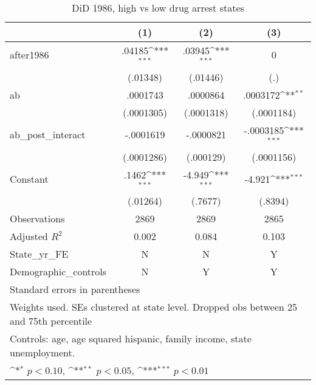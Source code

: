 \begin{table}[htbp]\centering
\def\sym#1{\ifmmode^{#1}\else\(^{#1}\)\fi}
\caption{DiD 1986, high vs low drug arrest states}
\begin{tabular}{l*{3}{c}}
\hline\hline
                    &\multicolumn{1}{c}{(1)}         &\multicolumn{1}{c}{(2)}         &\multicolumn{1}{c}{(3)}         \\
\hline
after1986           &      .04185\sym{***}&      .03945\sym{***}&           0         \\
                    &    (.01348)         &    (.01446)         &         (.)         \\
[1em]
ab                  &    .0001743         &    .0000864         &    .0003172\sym{**} \\
                    &  (.0001305)         &  (.0001318)         &  (.0001184)         \\
[1em]
ab\_post\_interact    &   -.0001619         &   -.0000821         &   -.0003185\sym{***}\\
                    &  (.0001286)         &   (.000129)         &  (.0001156)         \\
[1em]
Constant            &       .1462\sym{***}&      -4.949\sym{***}&      -4.921\sym{***}\\
                    &    (.01264)         &     (.7677)         &     (.8394)         \\
\hline
Observations        &        2869         &        2869         &        2865         \\
Adjusted \(R^{2}\)  &       0.002         &       0.084         &       0.103         \\
State\_yr\_FE         &           N         &           N         &           Y         \\
Demographic\_controls&           N         &           Y         &           Y         \\
\hline\hline
\multicolumn{4}{l}{\footnotesize Standard errors in parentheses}\\
\multicolumn{4}{l}{\footnotesize Weights used. SEs clustered at state level. Dropped obs between 25 and 75th percentile}\\
\multicolumn{4}{l}{\footnotesize Controls: age, age squared hispanic, family income, state unemployment.}\\
\multicolumn{4}{l}{\footnotesize \sym{*} \(p<0.10\), \sym{**} \(p<0.05\), \sym{***} \(p<0.01\)}\\
\end{tabular}
\end{table}
